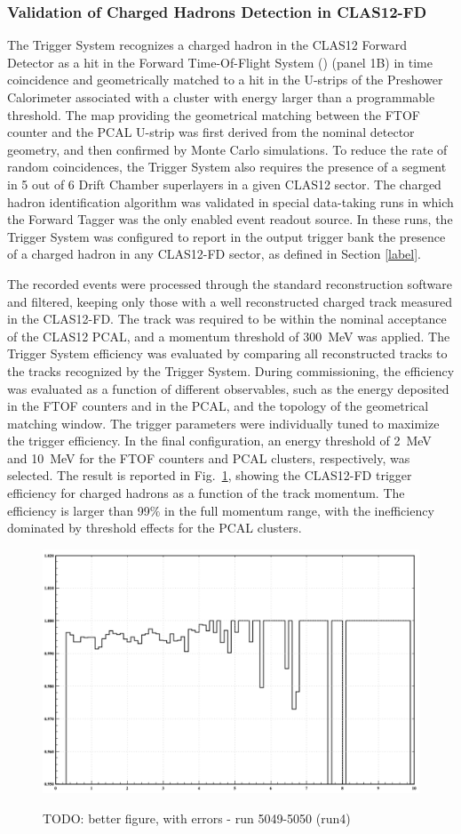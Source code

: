 \subsubsection{Validation of Charged Hadrons Detection in CLAS12-FD}

The Trigger System recognizes a charged hadron in the CLAS12 Forward Detector as a hit in the Forward Time-Of-Flight System (\cite{ftof-ref}) (panel 1B) in time coincidence and geometrically matched to a hit in the U-strips of the Preshower Calorimeter \cite{ec-ref} associated with a cluster with energy larger than a programmable threshold. The map providing the geometrical matching between the FTOF counter and the PCAL U-strip was first derived from the nominal detector geometry, and then confirmed by Monte Carlo simulations. To reduce the rate of random coincidences, the Trigger System also requires the presence of a segment in 5 out of 6 Drift Chamber superlayers in a given CLAS12 sector. The charged hadron identification algorithm was validated in special data-taking runs in which the Forward Tagger was the only enabled event readout source. In these runs, the Trigger System was configured to report in the output trigger bank the presence of a charged hadron in any CLAS12-FD sector, as defined in Section \ref{label}. 

The recorded events were processed through the standard reconstruction software and filtered, keeping only those with a well reconstructed charged track measured in the CLAS12-FD. The track was required to be within the nominal acceptance of the CLAS12 PCAL, and a momentum threshold of 300~MeV was applied. The Trigger System efficiency was evaluated by comparing all reconstructed tracks to the tracks recognized by the Trigger System. During commissioning, the efficiency was evaluated as a function of different observables, such as the energy deposited in the FTOF counters and in the PCAL, and the topology of the geometrical matching window. The trigger parameters were individually tuned to maximize the trigger efficiency. In the final configuration, an energy threshold of 2~MeV and 10~MeV for the FTOF counters and PCAL clusters, respectively, was selected. The result is reported in Fig.~\ref{fig:FD_TrackEfficiency}, showing the CLAS12-FD trigger efficiency for charged hadrons as a function of the track momentum. The efficiency is larger than 99$\%$ in the full momentum range, with the inefficiency dominated by threshold effects for the PCAL clusters.

\begin{figure}[!htb]
 \centering
{\includegraphics[width=.5\textwidth]{img/FD_TrackEfficiency.png}}
 \caption{TODO: better figure, with errors - run 5049-5050 (run4)}
 \label{fig:FD_TrackEfficiency}
\end{figure}
